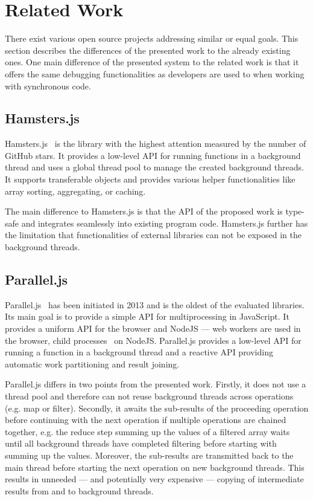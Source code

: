 \section{Related Work}\label{sec:related-work}
There exist various open source projects addressing similar or equal goals. This section describes the differences of the presented work to the already existing ones. One main difference of the presented system to the related work is that it offers the same debugging functionalities as developers are used to when working with synchronous code.

\subsection{Hamsters.js}
Hamsters.js~\cite{hamstersjs} is the library with the highest attention measured by the number of GitHub stars. It provides a low-level API for running functions in a background thread and uses a global thread pool to manage the created background threads. It supports transferable objects and provides various helper functionalities like array sorting, aggregating, or caching.

The main difference to Hamsters.js is that the API of the proposed work is type-safe and integrates seamlessly into existing program code. Hamsters.js further has the limitation that functionalities of external libraries can not be exposed in the background threads.

\subsection{Parallel.js}
Parallel.js~\cite{SavitzkyMayr2016} has been initiated in 2013 and is the oldest of the evaluated libraries. Its main goal is to provide a simple API for multiprocessing in JavaScript. It provides a uniform API for the browser and NodeJS --- web workers are used in the browser, child processes~\cite{childProcess} on NodeJS. Parallel.js provides a low-level API for running a function in a background thread and a reactive API providing automatic work partitioning and result joining. 

Parallel.js differs in two points from the presented work. Firstly, it does not use a thread pool and therefore can not reuse background threads across operations (e.g. map or filter). Secondly, it awaits the sub-results of the proceeding operation before continuing with the next operation if multiple operations are chained together, e.g. the reduce step summing up the values of a filtered array waits until all background threads have completed filtering before starting with summing up the values. Moreover, the sub-results are transmitted back to the main thread before starting the next operation on new background threads. This results in unneeded --- and potentially very expensive --- copying of intermediate results from and to background threads.


